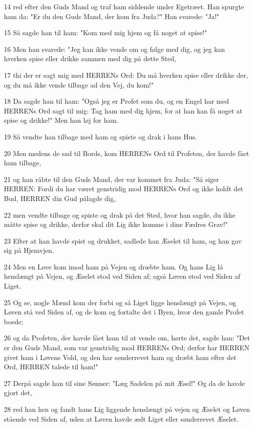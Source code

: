 \par 14 red efter den Guds Mand og traf ham siddende under Egetræet. Han spurgte ham da: "Er du den Guds Mand, der kom fra Juda?" Han svarede: "Ja!"
\par 15 Så sagde han til ham: "Kom med mig hjem og få noget at spise!"
\par 16 Men han svarede: "Jeg kan ikke vende om og følge med dig, og jeg kan hverken spise eller drikke sammen med dig på dette Sted,
\par 17 thi der er sagt mig med HERRENs Ord: Du må hverken spise eller drikke der, og du må ikke vende tilbage ad den Vej, du kom!"
\par 18 Da sagde han til ham: "Også jeg er Profet som du, og en Engel har med HERRENs Ord sagt til mig: Tag ham med dig hjem, for at han kan få noget at spise og drikke!" Men han løj for ham.
\par 19 Så vendte han tilbage med ham og spiste og drak i hans Hus.
\par 20 Men medens de sad til Bords, kom HERRENs Ord til Profeten, der havde fået ham tilbage,
\par 21 og han råbte til den Guds Mand, der var kommet fra Juda: "Så siger HERREN: Fordi du har været genstridig mod HERRENs Ord og ikke holdt det Bud, HERREN din Gud pålagde dig,
\par 22 men vendte tilbage og spiste og drak på det Sted, hvor han sagde, du ikke måtte spise og drikke, derfor skal dit Lig ikke komme i dine Fædres Grav!"
\par 23 Efter at han havde spist og drukket, sadlede han Æselet til ham, og han gav sig på Hjemvjen.
\par 24 Men en Løve kom imod ham på Vejen og dræbte ham. Og hans Lig lå henslængt på Vejen, og Æselet stod ved Siden af; også Løven stod ved Siden af Liget.
\par 25 Og se, nogle Mænd kom der forbi og så Liget ligge henslængt på Vejen, og Løven stå ved Siden af, og de kom og fortalte det i Byen, hvor den gamle Profet boede;
\par 26 og da Profeten, der havde fået ham til at vende om, hørte det, sagde han: "Det er den Guds Mand, som var genstridig mod HERRENs Ord; derfor har HERREN givet ham i Løvens Vold, og den har sønderrevet ham og dræbt ham efter det Ord, HERREN talede til ham!"
\par 27 Derpå sagde han til sine Sønner: "Læg Sadelen på mit Æsel!" Og da de havde gjort det,
\par 28 red han hen og fandt hans Lig liggende henslængt på vejen og Æselet og Løven stående ved Siden af, uden at Løven havde ædt Liget eller sønderrevet Æselet.
